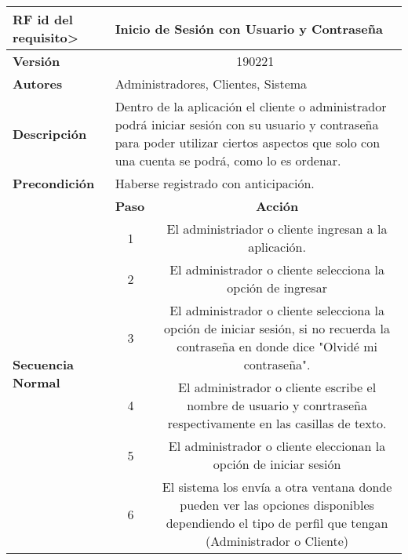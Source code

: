 \documentclass[conference]{IEEEtran}
\begin{document}
\begin{table}[H]
  \centering
   \begin{adjustbox}{width=0.47\textwidth}
    \begin{tabular}{|p{11.215em}|p{5.355em}|c|}
    \toprule
    \textbf{RF id del requisito>} & \multicolumn{2}{p{37.355em}|}{\textbf{Inicio de Sesión con Usuario y Contraseña}} \\
    \midrule
    \textbf{Versión} & \multicolumn{2}{c|}{190221} \\
    \midrule
    \textbf{Autores} & \multicolumn{2}{p{37.355em}|}{Administradores, Clientes, Sistema} \\
    \midrule
    \textbf{Descripción} & \multicolumn{2}{p{37.355em}|}{Dentro de la aplicación el cliente o administrador podrá iniciar sesión con su usuario y contraseña para poder utilizar ciertos aspectos que solo con una cuenta se podrá, como lo es ordenar.} \\
    \midrule
    \textbf{Precondición} & \multicolumn{2}{p{37.355em}|}{Haberse registrado con anticipación.} \\
    \midrule
    \multirow{9}[16]{*}{\textbf{Secuencia Normal}} & \textbf{Paso} & \multicolumn{1}{p{32em}|}{\textbf{Acción}} \\
\cmidrule{2-3}    \multicolumn{1}{|c|}{} & \multicolumn{1}{c|}{\multirow{2}[2]{*}{1}} & \multicolumn{1}{c|}{\multirow{2}[2]{*}{El administriador o cliente ingresan a la aplicación.}} \\
    \multicolumn{1}{|c|}{} & \multicolumn{1}{c|}{} &  \\
\cmidrule{2-3}    \multicolumn{1}{|c|}{} & \multicolumn{1}{c|}{2} & \multicolumn{1}{p{32em}|}{El administrador o cliente selecciona la opción de ingresar} \\
\cmidrule{2-3}    \multicolumn{1}{|c|}{} & \multicolumn{1}{c|}{3} & \multicolumn{1}{p{32em}|}{El administrador o cliente selecciona la opción de iniciar sesión, si no recuerda la contraseña en donde dice "Olvidé mi contraseña".} \\
\cmidrule{2-3}    \multicolumn{1}{|c|}{} & \multicolumn{1}{c|}{4} & \multicolumn{1}{p{32em}|}{El administrador o cliente escribe el nombre de usuario y conrtraseña respectivamente en las casillas de texto.} \\
\cmidrule{2-3}    \multicolumn{1}{|c|}{} & \multicolumn{1}{c|}{5} & \multicolumn{1}{p{32em}|}{El administrador o cliente eleccionan la opción de iniciar sesión} \\
\cmidrule{2-3}    \multicolumn{1}{|c|}{} & \multicolumn{1}{c|}{6} & \multicolumn{1}{p{32em}|}{El sistema los envía a otra ventana donde pueden ver las opciones disponibles dependiendo el tipo de perfil que tengan (Administrador o Cliente)} \\

\end{tabular}
\end{adjustbox}
\end{table}
\end{document}
